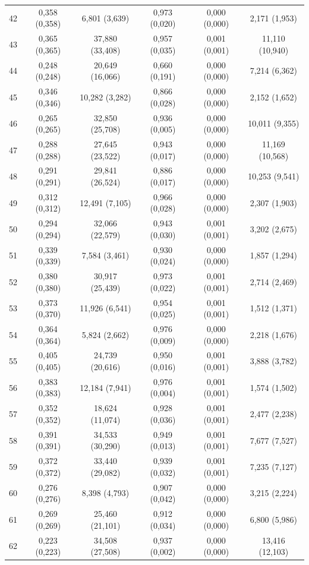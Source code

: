 \begin{tabular}{l c c c c c}
42 & 0,358 (0,358) & 6,801 (3,639) & 0,973 (0,020) & 0,000 (0,000) & 2,171 (1,953) \\
43 & 0,365 (0,365) & 37,880 (33,408) & 0,957 (0,035) & 0,001 (0,001) & 11,110 (10,940) \\
44 & 0,248 (0,248) & 20,649 (16,066) & 0,660 (0,191) & 0,000 (0,000) & 7,214 (6,362) \\
45 & 0,346 (0,346) & 10,282 (3,282) & 0,866 (0,028) & 0,000 (0,000) & 2,152 (1,652) \\
46 & 0,265 (0,265) & 32,850 (25,708) & 0,936 (0,005) & 0,000 (0,000) & 10,011 (9,355) \\
47 & 0,288 (0,288) & 27,645 (23,522) & 0,943 (0,017) & 0,000 (0,000) & 11,169 (10,568) \\
48 & 0,291 (0,291) & 29,841 (26,524) & 0,886 (0,017) & 0,000 (0,000) & 10,253 (9,541) \\
49 & 0,312 (0,312) & 12,491 (7,105) & 0,966 (0,028) & 0,000 (0,000) & 2,307 (1,903) \\
50 & 0,294 (0,294) & 32,066 (22,579) & 0,943 (0,030) & 0,001 (0,001) & 3,202 (2,675) \\
51 & 0,339 (0,339) & 7,584 (3,461) & 0,930 (0,024) & 0,000 (0,000) & 1,857 (1,294) \\
52 & 0,380 (0,380) & 30,917 (25,439) & 0,973 (0,022) & 0,001 (0,001) & 2,714 (2,469) \\
53 & 0,373 (0,370) & 11,926 (6,541) & 0,954 (0,025) & 0,001 (0,001) & 1,512 (1,371) \\
54 & 0,364 (0,364) & 5,824 (2,662) & 0,976 (0,009) & 0,000 (0,000) & 2,218 (1,676) \\
55 & 0,405 (0,405) & 24,739 (20,616) & 0,950 (0,016) & 0,001 (0,001) & 3,888 (3,782) \\
56 & 0,383 (0,383) & 12,184 (7,941) & 0,976 (0,004) & 0,001 (0,001) & 1,574 (1,502) \\
57 & 0,352 (0,352) & 18,624 (11,074) & 0,928 (0,036) & 0,001 (0,001) & 2,477 (2,238) \\
58 & 0,391 (0,391) & 34,533 (30,290) & 0,949 (0,013) & 0,001 (0,001) & 7,677 (7,527) \\
59 & 0,372 (0,372) & 33,440 (29,082) & 0,939 (0,032) & 0,001 (0,001) & 7,235 (7,127) \\
60 & 0,276 (0,276) & 8,398 (4,793) & 0,907 (0,042) & 0,000 (0,000) & 3,215 (2,224) \\
61 & 0,269 (0,269) & 25,460 (21,101) & 0,912 (0,034) & 0,000 (0,000) & 6,800 (5,986) \\
62 & 0,223 (0,223) & 34,508 (27,508) & 0,937 (0,002) & 0,000 (0,000) & 13,416 (12,103) \\

\end{tabular}
